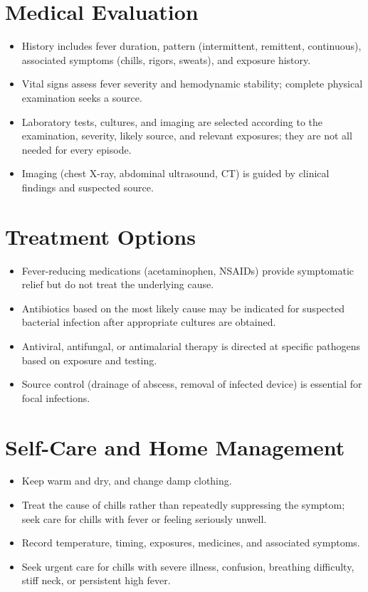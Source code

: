 \section*{Medical Evaluation}
\begin{itemize}
  \item History includes fever duration, pattern (intermittent, remittent, continuous), associated symptoms (chills, rigors, sweats), and exposure history.
  \item Vital signs assess fever severity and hemodynamic stability; complete physical examination seeks a source.
  \item Laboratory tests, cultures, and imaging are selected according to the examination, severity, likely source, and relevant exposures; they are not all needed for every episode.
  \item Imaging (chest X-ray, abdominal ultrasound, CT) is guided by clinical findings and suspected source.
\end{itemize}

\section*{Treatment Options}
\begin{itemize}
  \item Fever-reducing medications (acetaminophen, NSAIDs) provide symptomatic relief but do not treat the underlying cause.
  \item Antibiotics based on the most likely cause may be indicated for suspected bacterial infection after appropriate cultures are obtained.
  \item Antiviral, antifungal, or antimalarial therapy is directed at specific pathogens based on exposure and testing.
  \item Source control (drainage of abscess, removal of infected device) is essential for focal infections.
\end{itemize}

\section*{Self-Care and Home Management}
\begin{itemize}
  \item Keep warm and dry, and change damp clothing.
  \item Treat the cause of chills rather than repeatedly suppressing the symptom; seek care for chills with fever or feeling seriously unwell.
  \item Record temperature, timing, exposures, medicines, and associated symptoms.
  \item Seek urgent care for chills with severe illness, confusion, breathing difficulty, stiff neck, or persistent high fever.
\end{itemize}


